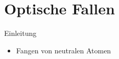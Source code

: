 \documentclass[12pt,xcolor=dvipsnames]{beamer}
\begin{document}
%
%

\section{Optische Fallen}

\begin{frame}{Einleitung}
	\begin{itemize}
		\item Fangen von neutralen Atomen
	\end{itemize}
\end{frame}
\end{document}

